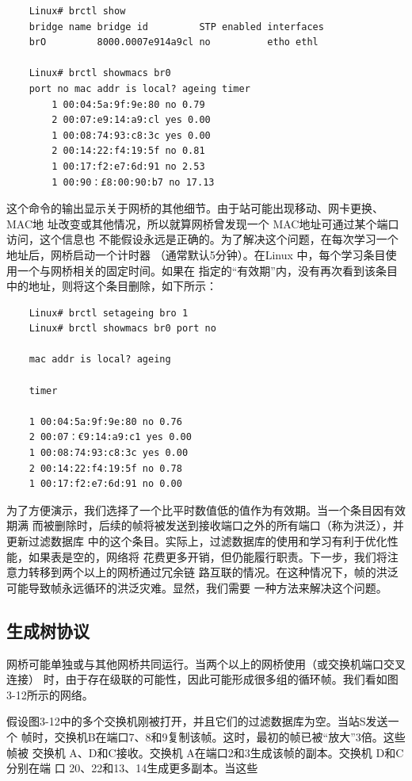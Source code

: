 \begin{verbatim}
    Linux# brctl show
    bridge name bridge id         STP enabled interfaces
    brO         8000.0007e914a9cl no          etho ethl
    
    Linux# brctl showmacs br0
    port no mac addr is local? ageing timer
        1 00:04:5a:9f:9e:80 no 0.79
        2 00:07:e9:14:a9:cl yes 0.00
        1 00:08:74:93:c8:3c yes 0.00
        2 00:14:22:f4:19:5f no 0.81
        1 00:17:f2:e7:6d:91 no 2.53
        1 00:90：£8:00:90:b7 no 17.13
\end{verbatim}

这个命令的输出显示关于网桥的其他细节。由于站可能出现移动、网卡更换、MAC地
址改变或其他情况，所以就算网桥曾发现一个 MAC地址可通过某个端口访问，这个信息也
不能假设永远是正确的。为了解决这个问题，在每次学习一个地址后，网桥启动一个计时器
（通常默认5分钟）。在Linux 中，每个学习条目使用一个与网桥相关的固定时间。如果在
指定的“有效期”内，没有再次看到该条目中的地址，则将这个条目删除，如下所示：

\begin{verbatim}
    Linux# brctl setageing bro 1
    Linux# brctl showmacs br0 port no
    
    mac addr is local? ageing
    
    timer
    
    1 00:04:5a:9f:9e:80 no 0.76
    2 00:07：€9:14:a9:c1 yes 0.00
    1 00:08:74:93:c8:3c yes 0.00
    2 00:14:22:f4:19:5f no 0.78
    1 00:17:f2:e7:6d:91 no 0.00
\end{verbatim}

为了方便演示，我们选择了一个比平时数值低的值作为有效期。当一个条目因有效期满
而被删除时，后续的帧将被发送到接收端口之外的所有端口（称为洪泛），并更新过滤数据库
中的这个条目。实际上，过滤数据库的使用和学习有利于优化性能，如果表是空的，网络将
花费更多开销，但仍能履行职责。下一步，我们将注意力转移到两个以上的网桥通过冗余链
路互联的情况。在这种情况下，帧的洪泛可能导致帧永远循环的洪泛灾难。显然，我们需要
一种方法来解决这个问题。

\subsection{生成树协议}

网桥可能单独或与其他网桥共同运行。当两个以上的网桥使用（或交换机端口交叉连接）
时，由于存在级联的可能性，因此可能形成很多组的循环帧。我们看如图3-12所示的网络。

假设图3-12中的多个交换机刚被打开，并且它们的过滤数据库为空。当站S发送一个
帧时，交换机B在端口7、8和9复制该帧。这时，最初的帧已被“放大”3倍。这些帧被
交换机 A、D和C接收。交换机 A在端口2和3生成该帧的副本。交换机 D和C分别在端
口 20、22和13、14生成更多副本。当这些

